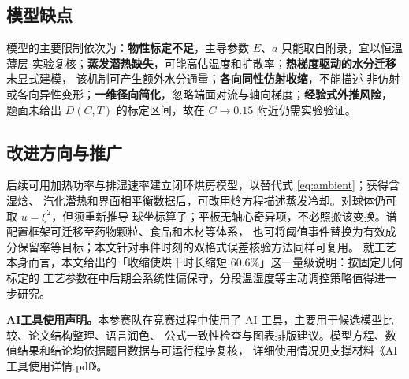\documentclass[withoutpreface,bwprint]{cumcmthesis}
\begin{document}
\subsection{模型缺点}

模型的主要限制依次为：\textbf{物性标定不足}，主导参数 $E$、$a$ 只能取自附录，宜以恒温薄层
实验复核；\textbf{蒸发潜热缺失}，可能高估温度和扩散率；\textbf{热梯度驱动的水分迁移}未显式建模，
该机制可产生额外水分通量\cite{philip}；\textbf{各向同性仿射收缩}，不能描述
非仿射或各向异性变形；\textbf{一维径向简化}，忽略端面对流与轴向梯度；\textbf{经验式外推风险}，
题面未给出 $D(C,T)$ 的标定区间，故在 $C\to0.15$ 附近仍需实验验证。

\subsection{改进方向与推广}

后续可用加热功率与排湿速率建立闭环烘房模型，以替代式 \eqref{eq:ambient}；获得含湿焓、
汽化潜热和界面相平衡数据后，可改用焓方程描述蒸发冷却。对球体仍可取 $u=\xi^2$，但须重新推导
球坐标算子；平板无轴心奇异项，不必照搬该变换。谱配置框架可迁移至药物颗粒、食品和木材等体系，
也可将阈值事件替换为有效成分保留率等目标；本文针对事件时刻的双格式误差核验方法同样可复用。
就工艺本身而言，本文给出的「收缩使烘干时长缩短 $60.6\%$」这一量级说明：按固定几何标定的
工艺参数在中后期会系统性偏保守，分段温湿度等主动调控策略\cite{ju2019stepdown}值得进一步研究。

\noindent\textbf{AI工具使用声明。}本参赛队在竞赛过程中使用了 AI 工具，主要用于候选模型比较、论文结构整理、语言润色、
公式一致性检查与图表排版建议。模型方程、数值结果和结论均依据题目数据与可运行程序复核，
详细使用情况见支撑材料《AI工具使用详情.pdf》。
\end{document}
